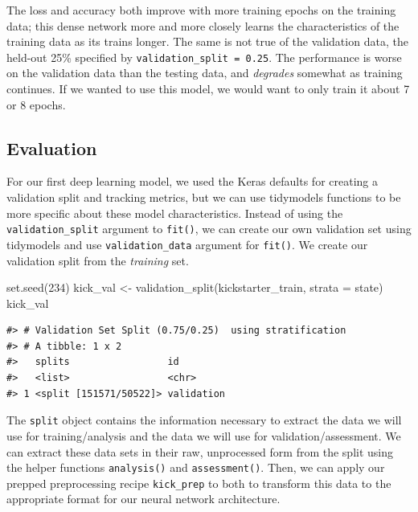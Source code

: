 \documentclass[
]{krantz}
\makeatletter
\newenvironment{Shaded}{\begin{snugshade}}{\end{snugshade}}
\newcommand{\AttributeTok}[1]{\textcolor[rgb]{0.77,0.63,0.00}{#1}}
\newcommand{\DecValTok}[1]{\textcolor[rgb]{0.00,0.00,0.81}{#1}}
\newcommand{\FunctionTok}[1]{\textcolor[rgb]{0.00,0.00,0.00}{#1}}
\newcommand{\NormalTok}[1]{#1}
\newcommand{\OtherTok}[1]{\textcolor[rgb]{0.56,0.35,0.01}{#1}}
\newenvironment{kframe}{%
\medskip{}
\setlength{\fboxsep}{.8em}
 \def\at@end@of@kframe{}%
 \ifinner\ifhmode%
  \def\at@end@of@kframe{\end{minipage}}%
  \begin{minipage}{\columnwidth}%
 \fi\fi%
 \def\FrameCommand##1{\hskip\@totalleftmargin \hskip-\fboxsep
 \colorbox{shadecolor}{##1}\hskip-\fboxsep
     \hskip-\linewidth \hskip-\@totalleftmargin \hskip\columnwidth}%
 \MakeFramed {\advance\hsize-\width
   \@totalleftmargin\z@ \linewidth\hsize
   \@setminipage}}%
 {\par\unskip\endMakeFramed%
 \at@end@of@kframe}
\renewenvironment{Shaded}{\begin{kframe}}{\end{kframe}}
\makeatother
\begin{document}
The loss and accuracy both improve with more training epochs on the training data; this dense network more and more closely learns the characteristics of the training data as its trains longer. The same is not true of the validation data, the held-out 25\% specified by \texttt{validation\_split\ =\ 0.25}. The performance is worse on the validation data than the testing data, and \emph{degrades} somewhat as training continues. If we wanted to use this model, we would want to only train it about 7 or 8 epochs.

\hypertarget{evaluate-dnn}{%
\subsection{Evaluation}\label{evaluate-dnn}}

For our first deep learning model, we used the Keras defaults for creating a validation split and tracking metrics, but we can use tidymodels functions to be more specific about these model characteristics. Instead of using the \texttt{validation\_split} argument to \texttt{fit()}, we can create our own validation set using tidymodels and use \texttt{validation\_data} argument for \texttt{fit()}. We create our validation split from the \emph{training} set.

\begin{Shaded}
\begin{Highlighting}[]
\FunctionTok{set.seed}\NormalTok{(}\DecValTok{234}\NormalTok{)}
\NormalTok{kick\_val }\OtherTok{\textless{}{-}} \FunctionTok{validation\_split}\NormalTok{(kickstarter\_train, }\AttributeTok{strata =}\NormalTok{ state)}
\NormalTok{kick\_val}
\end{Highlighting}
\end{Shaded}

\begin{verbatim}
#> # Validation Set Split (0.75/0.25)  using stratification 
#> # A tibble: 1 x 2
#>   splits                 id        
#>   <list>                 <chr>     
#> 1 <split [151571/50522]> validation
\end{verbatim}

The \texttt{split} object contains the information necessary to extract the data we will use for training/analysis and the data we will use for validation/assessment. We can extract these data sets in their raw, unprocessed form from the split using the helper functions \texttt{analysis()} and \texttt{assessment()}. Then, we can apply our prepped preprocessing recipe \texttt{kick\_prep} to both to transform this data to the appropriate format for our neural network architecture.
\end{document}
